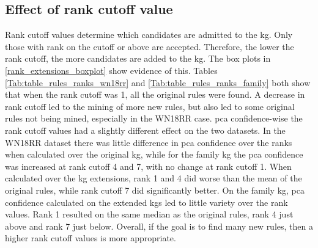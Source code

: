 \fi




\newpage
\subsection{Effect of rank cutoff value}
Rank cutoff values determine which candidates are admitted to the \gls{kg}. Only those with rank on the cutoff or above are accepted. Therefore, the lower the rank cutoff, the more candidates are added to the \gls{kg}. The box plots in \cref{rank_extensions_boxplot} show evidence of this. Tables \ref{Tab:table_rules_ranks_wn18rr} and \ref{Tab:table_rules_ranks_family} both show that when the rank cutoff was 1, all the original rules were found. A decrease in rank cutoff led to the mining of more new rules, but also led to some original rules not being mined, especially in the WN18RR case. \gls{pca} confidence-wise the rank cutoff values had a slightly different effect on the two datasets. In the WN18RR dataset there was little difference in \gls{pca} confidence over the ranks when calculated over the original \gls{kg}, while for the family \gls{kg} the \gls{pca} confidence was increased at rank cutoff 4 and 7, with no change at rank cutoff 1. When calculated over the \gls{kg} extensions, rank 1 and 4 did worse than the mean of the original rules, while rank cutoff 7 did significantly better. On the family \gls{kg}, \gls{pca} confidence calculated on the extended \glspl{kg} led to little variety over the rank values. Rank 1 resulted on the same median as the original rules, rank 4 just above and rank 7 just below. Overall, if the goal is to find many new rules, then a higher rank cutoff values is more appropriate.

